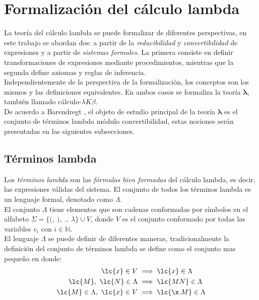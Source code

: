 \section{Formalización del cálculo lambda}

La teoría del cálculo lambda se puede formalizar de diferentes perspectivas, en
este trabajo se abordan dos: a partir de la \emph{reducibilidad} y
\emph{convertibilidad} de expresiones y a partir de \emph{sistemas formales}. La
primera consiste en definir transformaciones de expresiones mediante
procedimientos, mientras que la segunda define axiomas y reglas de inferencia.
\\

Independientemente de la perspectiva de la formalización, los conceptos son los
mismos y las definiciones equivalentes. En ambos casos se formaliza la teoría
\(\boldsymbol{\lambda}\), también llamado cálculo-\(\lambda K \beta\). \\

De acuerdo a Barendregt \cite{Barendregt:Bible}, el objeto de estudio principal
de la teoría \(\boldsymbol{\lambda}\) es el conjunto de términos lambda módulo
convertibilidad, estas nociones serán presentadas en las siguientes
subsecciones. \\

\subsection{Términos lambda}

Los \emph{términos lambda} son las \emph{fórmulas bien formadas} del cálculo
lambda, es decir, las expresiones válidas del sistema. El conjunto de todos los
términos lambda es un lenguaje formal, denotado como \(\Lambda\). \\

El conjunto \(\Lambda\) tiene elementos que son cadenas conformadas por símbolos
en el alfabeto \(\Sigma = \{\texttt{(},\ \texttt{)},\ \texttt{.},\ \lambda\}
\cup V\), donde \(V\) es el conjunto conformado por todas las variables
\(v_{i}\) con \(i\in \mathbb{N}\). \\

El lenguaje \(\Lambda\) se puede definir de diferentes maneras,
tradicionalmente la definición del conjunto de términos lambda se define como el
conjunto mas pequeño en donde: \\

\begin{align}
  \lc{x} \in V &\implies \lc{x} \in \Lambda\\
  \lc{M},\ \lc{N} \in \Lambda &\implies \lc{M N} \in \Lambda\\
  \lc{M} \in \Lambda,\ \lc{x} \in V &\implies \lc{\x.M} \in \Lambda
\end{align}

